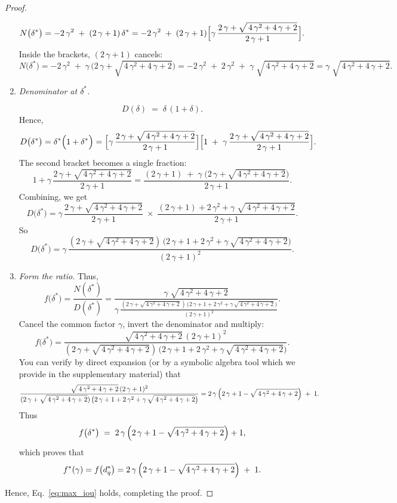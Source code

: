 \begin{proof}
\begin{enumerate}
\[
N\bigl(\delta^*\bigr)
=
-2\,\gamma^2
\;+\;
(2\,\gamma +1)\,\delta^*
=
-2\,\gamma^2
\;+\;
(2\,\gamma +1)
\Bigl[
  \gamma
  \,\frac{
    2\,\gamma + \sqrt{\,4\,\gamma^2 +4\,\gamma +2}
  }{
    2\,\gamma +1
  }
\Bigr].
\]
Inside the brackets, \((2\,\gamma +1)\) cancels:
\[
N\bigl(\delta^*\bigr)
=
-2\,\gamma^2 
\;+\; 
\gamma\,\bigl(2\,\gamma + \sqrt{\,4\,\gamma^2 +4\,\gamma +2}\bigr)
=
-2\,\gamma^2 
\;+\;
2\,\gamma^2
\;+\;
\gamma\;\sqrt{\,4\,\gamma^2 +4\,\gamma +2}
=
\gamma\;\sqrt{\,4\,\gamma^2 +4\,\gamma +2}.
\]

\item 
\textit{Denominator at \(\delta^*\).}

\[
D(\delta)
\;=\;
\delta\,(1 + \delta).
\]
Hence,
\[
D\bigl(\delta^*\bigr)
=
\delta^*
\Bigl(1 + \delta^*\Bigr)
=
\Bigl[
  \gamma \,\frac{2\,\gamma + \sqrt{\,4\,\gamma^2 +4\,\gamma +2}}{2\,\gamma +1}
\Bigr]
\Bigl[
  1
  \;+\;
  \gamma \,\frac{2\,\gamma + \sqrt{\,4\,\gamma^2 +4\,\gamma +2}}{2\,\gamma +1}
\Bigr].
\]
The second bracket becomes a single fraction:
\[
1 
+ 
\gamma \,\frac{2\,\gamma + \sqrt{\,4\,\gamma^2 +4\,\gamma +2}}{2\,\gamma +1}
=
\frac{
  (2\,\gamma +1)
  \;+\;
  \gamma\;\bigl(2\,\gamma + \sqrt{\,4\,\gamma^2 +4\,\gamma +2}\bigr)
}{
  2\,\gamma +1
}.
\]
Combining, we get
\[
D\bigl(\delta^*\bigr)
=
\gamma \,\frac{2\,\gamma + \sqrt{\,4\,\gamma^2 +4\,\gamma +2}}{2\,\gamma +1}
\;\times\;
\frac{
  (2\,\gamma +1)
  + 
  2\,\gamma^2 
  + 
  \gamma\;\sqrt{\,4\,\gamma^2 +4\,\gamma +2}
}{
  2\,\gamma +1
}.
\]
So
\[
D\bigl(\delta^*\bigr)
=
\gamma\,
\frac{
  (2\,\gamma + \sqrt{\,4\,\gamma^2 +4\,\gamma +2})
  \,\bigl(
    2\,\gamma +1 + 2\,\gamma^2 
    + 
    \gamma\,\sqrt{\,4\,\gamma^2 +4\,\gamma +2}
  \bigr)
}{
  (2\,\gamma +1)^2
}.
\]

\item
\textit{Form the ratio.}  
Thus,
\[
f\bigl(\delta^*\bigr)
=
\frac{
  N(\delta^*)
}{
  D(\delta^*)
}
=
\frac{
  \gamma\;\sqrt{\,4\,\gamma^2 +4\,\gamma +2}
}{
  \gamma 
  \,\frac{
    (2\,\gamma + \sqrt{\,4\,\gamma^2 +4\,\gamma +2})
    \,\bigl(
      2\,\gamma +1 + 2\,\gamma^2 
      + 
      \gamma\,\sqrt{\,4\,\gamma^2 +4\,\gamma +2}
    \bigr)
  }{
    (2\,\gamma +1)^2
  }
}.
\]
Cancel the common factor \(\gamma\), invert the denominator and multiply:
\[
f\bigl(\delta^*\bigr)
=
\frac{
  \sqrt{\,4\,\gamma^2 +4\,\gamma +2}\,(2\,\gamma +1)^2
}{
  (2\,\gamma + \sqrt{\,4\,\gamma^2 +4\,\gamma +2})
  \,\bigl(
    2\,\gamma +1 + 2\,\gamma^2 
    + 
    \gamma\,\sqrt{\,4\,\gamma^2 +4\,\gamma +2}
  \bigr)
}.
\]
You can verify by direct expansion (or by a symbolic algebra tool which we provide in the supplementary material) that
\[
\frac{
  \sqrt{\,4\,\gamma^2 +4\,\gamma +2}\,(2\,\gamma +1)^2
}{
  (2\,\gamma + \sqrt{\,4\,\gamma^2 +4\,\gamma +2})
  \,\bigl(
    2\,\gamma +1 + 2\,\gamma^2 
    + 
    \gamma\,\sqrt{\,4\,\gamma^2 +4\,\gamma +2}
  \bigr)
}
=
2\,\gamma\,\Bigl(2\,\gamma +1 - \sqrt{\,4\,\gamma^2 +4\,\gamma +2}\Bigr) 
\;+\;
1.
\]
Thus
\[
f\bigl(\delta^*\bigr)
\;=\;
2\,\gamma\,\Bigl(2\,\gamma +1 - \sqrt{4\,\gamma^2 +4\,\gamma +2}\Bigr) + 1,
\]
which proves that
\[
f^*(\gamma)
=
f\bigl(d_q^*\bigr)
=
2\,\gamma\,\Bigl(2\,\gamma +1 - \sqrt{4\,\gamma^2 +4\,\gamma +2}\Bigr)
\;+\;
1.
\]
\end{enumerate}

Hence, Eq.~\ref{eq:max_iou} holds, completing the proof.
\end{proof}

